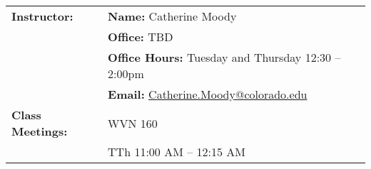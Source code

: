 \documentclass[11pt]{article}
\makeatletter
\newcommand{\TheInstructor}{Catherine Moody}
\newcommand{\TheOffice}{TBD}
\newcommand{\TheOfficeHours}{Tuesday and Thursday 12:30 -- 2:00pm}
\newcommand{\TheEmail}{Catherine.Moody@colorado.edu}
\newcommand{\TheLocation}{WVN 160}
\newcommand{\TheTime}{11:00 AM -- 12:15 AM}
\makeatother
\begin{document}
\begin{longtable}{lp{5.2in}}
%
\textbf{Instructor:}
  & {\bf Name:}   \hspace{8.00ex} \TheInstructor
  \\
  & {\bf Office:}  \hspace{8.25ex} \TheOffice
  \\
  & {\bf Office Hours:} \hspace{.20ex} \TheOfficeHours
  \\
  & {\bf Email:}  \hspace{8.00ex} \href{mailto:\TheEmail}{\TheEmail}
  \\[6pt]
%

\textbf{Class Meetings:}
  & \TheLocation
  \\
  & TTh \TheTime 
 \\[6pt]


\end{longtable}
\end{document}
